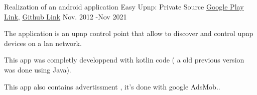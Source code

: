 \documentclass[11pt, a4paper]{awesome-cv} %
\begin{document}
\begin{cventries}
    \cventry
    {Realization of an android application } %
    {Easy Upnp: Private Source} %
    { \href{https://play.google.com/store/apps/details?id=com.easysoftin.easyup}{Google Play Link}, \href{https://bitbucket.org/easysoftin/easyup/src/master/}{Github Link} } %
    {Nov. 2012 -Nov 2021} %
    { %
        \begin{cvitems}
            \item {The application is an upnp control point that allow to discover and control upnp devices on a lan network.}
            \item {This app was completly developpend with kotlin code ( a old previous version was done using Java).}
            \item {This app also contains advertissment , it's done with google AdsMob..}
        \end{cvitems}
    }

\end{cventries}
\end{document}
